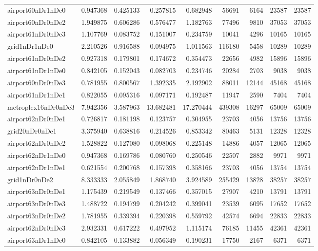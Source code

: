 \begin{longtable}{|l|r|r|r|r|r|r|r|r|}
airport60nDr1nDe0 & 0.947368 & 0.425133 & 0.257815 & 0.682948 & 56691 & 6164 & 23587 & 23587 \\
airport60nDr0nDe2 & 1.949875 & 0.606286 & 0.576477 & 1.182763 & 77496 & 9810 & 37053 & 37053 \\
airport61nDr0nDe3 & 1.107769 & 0.083752 & 0.151007 & 0.234759 & 10041 & 4296 & 10165 & 10165 \\
grid1nDr1nDe0 & 2.210526 & 0.916588 & 0.094975 & 1.011563 & 116180 & 5458 & 10289 & 10289 \\
airport61nDr0nDe2 & 0.927318 & 0.179801 & 0.174672 & 0.354473 & 22656 & 4982 & 15896 & 15896 \\
airport61nDr1nDe0 & 0.842105 & 0.152043 & 0.082703 & 0.234746 & 20284 & 2703 & 9038 & 9038 \\
airport60nDr0nDe3 & 0.781955 & 0.800567 & 1.392335 & 2.192902 & 88011 & 12144 & 45168 & 45168 \\
airport61nDr1nDe1 & 0.822055 & 0.095316 & 0.097171 & 0.192487 & 11947 & 2590 & 7404 & 7404 \\
metroplex16nDr0nDe3 & 7.942356 & 3.587963 & 13.682481 & 17.270444 & 439308 & 16297 & 65009 & 65009 \\
airport62nDr0nDe1 & 0.726817 & 0.181198 & 0.123757 & 0.304955 & 23703 & 4056 & 13756 & 13756 \\
grid20nDr0nDe1 & 3.375940 & 0.638816 & 0.214526 & 0.853342 & 80463 & 5131 & 12328 & 12328 \\
airport62nDr0nDe2 & 1.528822 & 0.127080 & 0.098068 & 0.225148 & 14886 & 4057 & 12065 & 12065 \\
airport62nDr1nDe0 & 0.947368 & 0.169786 & 0.080760 & 0.250546 & 22507 & 2882 & 9971 & 9971 \\
airport62nDr1nDe1 & 0.621554 & 0.200768 & 0.157398 & 0.358166 & 23703 & 4056 & 13754 & 13754 \\
grid1nDr0nDe2 & 8.333333 & 2.055849 & 1.868740 & 3.924589 & 255429 & 13828 & 38257 & 38257 \\
airport63nDr0nDe1 & 1.175439 & 0.219549 & 0.137466 & 0.357015 & 27907 & 4210 & 13791 & 13791 \\
airport63nDr0nDe3 & 1.488722 & 0.194799 & 0.204242 & 0.399041 & 23539 & 6095 & 17652 & 17652 \\
airport63nDr0nDe2 & 1.781955 & 0.339394 & 0.220398 & 0.559792 & 42574 & 6694 & 22833 & 22833 \\
airport62nDr0nDe3 & 2.932331 & 0.617222 & 0.497952 & 1.115174 & 76185 & 11455 & 42361 & 42361 \\
airport63nDr1nDe0 & 0.842105 & 0.133882 & 0.056349 & 0.190231 & 17750 & 2167 & 6371 & 6371 \\

\end{longtable}
